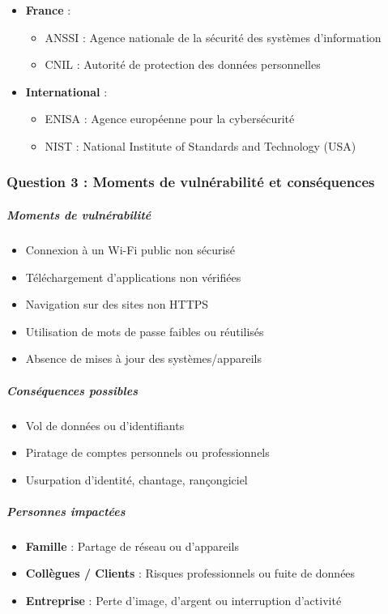 \documentclass[12pt,a4paper]{article}
\begin{document}
\begin{itemize}
    \item \textbf{France} :
    \begin{itemize}
        \item ANSSI : Agence nationale de la sécurité des systèmes d'information
        \item CNIL : Autorité de protection des données personnelles
    \end{itemize}
    \item \textbf{International} :
    \begin{itemize}
        \item ENISA : Agence européenne pour la cybersécurité
        \item NIST : National Institute of Standards and Technology (USA)
    \end{itemize}
\end{itemize}

\subsubsection{Question 3 : Moments de vulnérabilité et conséquences}

\subparagraph*{Moments de vulnérabilité}

\begin{itemize}
    \item Connexion à un Wi-Fi public non sécurisé
    \item Téléchargement d’applications non vérifiées
    \item Navigation sur des sites non HTTPS
    \item Utilisation de mots de passe faibles ou réutilisés
    \item Absence de mises à jour des systèmes/appareils
\end{itemize}

\subparagraph*{Conséquences possibles}

\begin{itemize}
    \item Vol de données ou d’identifiants
    \item Piratage de comptes personnels ou professionnels
    \item Usurpation d’identité, chantage, rançongiciel
\end{itemize}

\subparagraph*{Personnes impactées}

\begin{itemize}
    \item \textbf{Famille} : Partage de réseau ou d’appareils
    \item \textbf{Collègues / Clients} : Risques professionnels ou fuite de données
    \item \textbf{Entreprise} : Perte d’image, d’argent ou interruption d’activité
\end{itemize}
\end{document}
